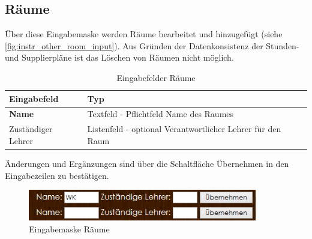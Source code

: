 \subsection{Räume}
Über diese Eingabemaske werden Räume bearbeitet und hinzugefügt (siehe \autoref{fig:instr_other_room_input}). Aus Gründen der Datenkonsistenz der Stunden- und Supplierpläne ist das Löschen von Räumen nicht möglich.
\begin{table}[H]
\centering
\begin{tabular}{p{3 cm}p{10 cm}}
   \toprule
   \textbf{Eingabefeld} & \textbf{Typ} \\
   \midrule
          \textbf{Name} & Textfeld - Pflichtfeld \newline Name des Raumes \\
          \hline
          Zuständiger Lehrer & Listenfeld - optional \newline Verantwortlicher Lehrer für den Raum\\
   \bottomrule
\end{tabular}
\caption{Eingabefelder Räume}
\end{table}
Änderungen und Ergänzungen sind über die Schaltfläche Übernehmen in den Eingabezeilen zu bestätigen.
\begin{figure}[H]
\centering
\includegraphics[keepaspectratio=true, width=10cm]{images/screenshots/rooms_input.png}
\caption{Eingabemaske Räume}
\label{fig:instr_other_room_input}
\end{figure}
